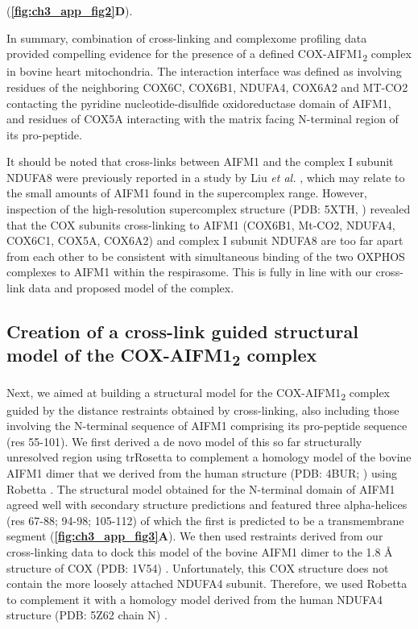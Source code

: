 (\textbf{\autoref{fig:ch3_app_fig2}D}).

In summary, combination of cross-linking and complexome profiling data provided compelling evidence for the presence of a defined COX-AIFM1\textsubscript{2} complex in bovine heart mitochondria. The interaction interface was defined as involving residues of the neighboring COX6C, COX6B1, NDUFA4, COX6A2 and MT-CO2 contacting the pyridine nucleotide-disulfide oxidoreductase domain of AIFM1, and residues of COX5A interacting with the matrix facing N-terminal region of its pro-peptide.

It should be noted that cross-links between AIFM1 and the complex I subunit NDUFA8 were previously reported in a study by Liu \emph{et al.} \cite{RN16}, which may relate to the small amounts of AIFM1 found in the supercomplex range. However, inspection of the high-resolution supercomplex structure (PDB: 5XTH, \cite{RN38}) revealed that the COX subunits cross-linking to AIFM1 (COX6B1, Mt-CO2, NDUFA4, COX6C1, COX5A, COX6A2) and complex I subunit NDUFA8 are too far apart from each other to be consistent with simultaneous binding of the two OXPHOS complexes to AIFM1 within the respirasome. This is fully in line with our cross-link data and proposed model of the complex.
%
\subsection*{Creation of a cross-link guided structural model of the COX-AIFM1\textsubscript{2} complex}
Next, we aimed at building a structural model for the COX-AIFM1\textsubscript{2} complex guided by the distance restraints obtained by cross-linking, also including those involving the N-terminal sequence of AIFM1 comprising its pro-peptide sequence (res 55-101). We first derived a de novo model of this so far structurally unresolved region using trRosetta \cite{RN39} to complement a homology model of the bovine AIFM1 dimer that we derived from the human structure (PDB: 4BUR; \cite{RN40}) using Robetta \cite{RN41}. The structural model obtained for the N-terminal domain of AIFM1 agreed well with secondary structure predictions and featured three alpha-helices (res 67-88; 94-98; 105-112) of which the first is predicted to be a transmembrane segment (\textbf{\autoref{fig:ch3_app_fig3}A}). We then used restraints derived from our cross-linking data to dock this model of the bovine AIFM1 dimer to the 1.8 Å structure of COX (PDB: 1V54) \cite{RN42}. Unfortunately, this COX structure does not contain the more loosely attached NDUFA4 subunit. Therefore, we used Robetta \cite{RN41} to complement it with a homology model derived from the human NDUFA4 structure (PDB: 5Z62 chain N)  \cite{RN43}.

